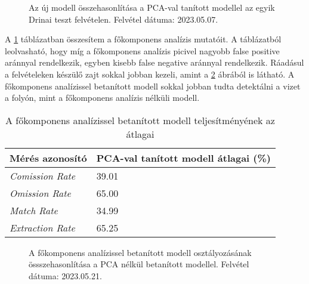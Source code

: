 \begin{figure}[H]
	\centering
	\hspace{5pt}
	\hspace{5pt}
	\caption{Az új modell összehasonlítása a PCA-val tanított modellel az egyik Drinai teszt felvételen. Felvétel dátuma: 2023.05.07.}
	\label{fig:pca-vs-no-pca}
\end{figure}

A \ref{tab:pca-vs-no-pca} táblázatban összesítem a főkomponens analízis mutatóit. A táblázatból leolvasható, hogy míg a főkomponens analízis picivel nagyobb false positive aránnyal rendelkezik, egyben kisebb false negative aránnyal rendelkezik. Ráadásul a felvételeken készülő zajt sokkal jobban kezeli, amint a \ref{fig:classification-pca-vs-no-pca} ábrából is látható. A főkomponens analízissel betanított modell sokkal jobban tudta detektálni a vizet a folyón, mint a főkomponens analízis nélküli modell.

\begin{table}[H]
	\centering
	\begin{tabular}{ | p{} | p{} | }
		\hline
		\textbf{Mérés azonosító} & \textbf{PCA-val tanított modell átlagai (\%)} \\
		\hline \hline
		\emph{Comission Rate} & 39.01 \\
		\hline
		\emph{Omission Rate} & 65.00 \\
		\hline
		\emph{Match Rate} & 34.99  \\
		\hline
        \emph{Extraction Rate} & 65.25 \\
		\hline
	\end{tabular}
	\caption{A főkomponens analízissel betanított modell teljesítményének az átlagai}
	\label{tab:pca-vs-no-pca}
\end{table}

\begin{figure}[H]
	\centering
	\hspace{5pt}
	\hspace{5pt}
	\caption{A főkomponens analízissel betanított modell osztályozásának össszehasonlítása a PCA nélkül betanított modellel. Felvétel dátuma: 2023.05.21.}
	\label{fig:classification-pca-vs-no-pca}
\end{figure}

